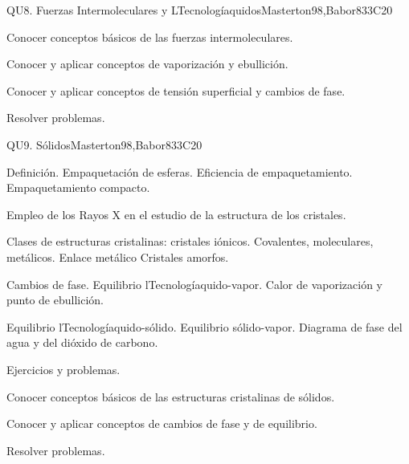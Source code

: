 \begin{syllabus}
\begin{unit}{QU8. Fuerzas Intermoleculares y LTecnologíaquidos}{}{Masterton98,Babor83}{3}{C20}
   \begin{learningoutcomes}
      \item Conocer conceptos básicos de las fuerzas intermoleculares.
      \item Conocer y aplicar conceptos de vaporización y ebullición.
      \item Conocer y aplicar conceptos de tensión superficial y cambios de fase.
      \item Resolver problemas.
   \end{learningoutcomes}
\end{unit}

\begin{unit}{QU9. Sólidos}{}{Masterton98,Babor83}{3}{C20}
\begin{topics}
      \item Definición. Empaquetación de esferas. Eficiencia de empaquetamiento. Empaquetamiento compacto.
      \item Empleo de los Rayos X en el estudio de la estructura de los cristales.
      \item Clases de estructuras cristalinas: cristales iónicos. Covalentes, moleculares, metálicos. Enlace metálico Cristales amorfos.
      \item Cambios de fase. Equilibrio lTecnologíaquido-vapor. Calor de vaporización y punto de ebullición.
      \item Equilibrio lTecnologíaquido-sólido. Equilibrio sólido-vapor. Diagrama de fase  del agua y del dióxido de carbono.
      \item Ejercicios y problemas.
    \end{topics}

   \begin{learningoutcomes}
      \item Conocer conceptos básicos de las estructuras cristalinas de sólidos.
      \item Conocer y aplicar conceptos de cambios de fase y de equilibrio.
      \item Resolver problemas.
   \end{learningoutcomes}
\end{unit}


\end{syllabus}
